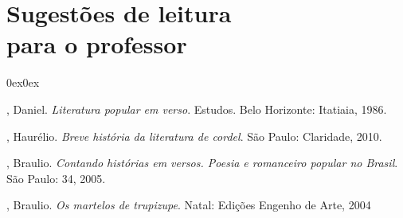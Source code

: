 \pagebreak

\section{Sugestões de leitura\\ para o professor} 

\begin{description}0ex\parsep0ex

, Daniel. \textit{Literatura popular em verso}. Estudos. Belo Horizonte: Itatiaia, 1986. 

, Haurélio. \textit{Breve história da literatura de cordel}. São Paulo: Claridade, 2010.

, Braulio. \textit{Contando histórias em versos. Poesia e romanceiro popular no Brasil}. São Paulo: 34, 2005.

, Braulio. \textit{Os martelos de trupizupe}. Natal: Edições Engenho de Arte, 2004 

\end{description}



